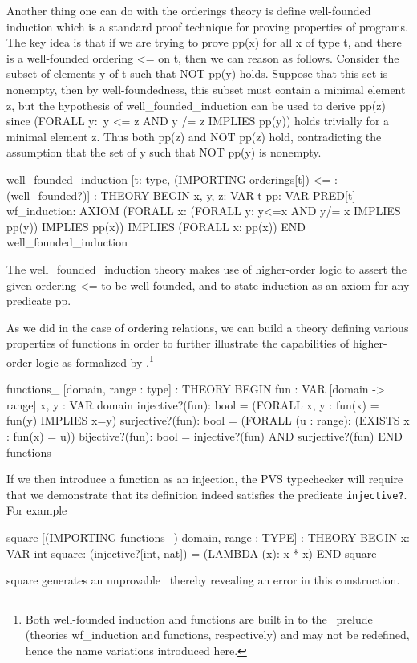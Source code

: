 Another thing one can do with the {\stt orderings} theory is define
well-founded induction which is a standard proof technique for proving
properties of programs.  The key idea is that if we are trying to
prove {\stt pp(x)} for all {\stt x} of type {\stt t}, and there is a
well-founded ordering {\stt <=} on {\stt t}, then we can reason as
follows.  Consider the subset of elements {\stt y} of {\stt t} such
that {\stt NOT pp(y)} holds.  Suppose that this set is nonempty, then
by well-foundedness, this subset must contain a minimal element {\stt
z}, but the hypothesis of {\stt well\_founded\_induction} can be used
to derive {\stt pp(z)} since {\stt (FORALL y:\ y <= z AND y /= z
IMPLIES pp(y))} holds trivially for a minimal element {\stt z}.  Thus
both {\stt pp(z)} and {\stt NOT pp(z)} hold, contradicting the
assumption that the set of {\stt y} such that {\stt NOT pp(y)} is
nonempty.
\begin{pvsexample}
  well_founded_induction [t: type,
                 (IMPORTING orderings[t])
                 <= : (well_founded?)] : THEORY
   BEGIN
    x, y, z: VAR t
    pp: VAR PRED[t]
    wf_induction: AXIOM
      (FORALL x: (FORALL y: y<=x AND y/= x IMPLIES pp(y))
                 IMPLIES pp(x))
      IMPLIES (FORALL x: pp(x))
   END well_founded_induction
\end{pvsexample}

The {\stt well\_founded\_induction} theory makes use of higher-order
logic to assert the given ordering {\stt <=} to be well-founded, and
to state induction as an axiom for any predicate {\stt pp}.

As we did in the case of ordering relations, we can build a theory
defining various properties of functions in order to further illustrate
the capabilities of higher-order logic as formalized by \pvs\@.\footnote
{Both well-founded induction and functions are built in to the \pvs\
prelude (theories {\stt wf\_induction} and {\stt functions}, respectively)
and may not be redefined, hence the name variations introduced here.}
\begin{pvsexample}
  functions_ [domain, range : type] : THEORY
   BEGIN
    fun : VAR [domain -> range]
    x, y : VAR domain
    injective?(fun): bool = (FORALL x, y : fun(x) = fun(y) IMPLIES x=y)
    surjective?(fun): bool = (FORALL (u : range): (EXISTS x : fun(x) = u))
    bijective?(fun): bool = injective?(fun) AND surjective?(fun)
   END functions_
\end{pvsexample}
%
If we then introduce a function as an injection, the PVS typechecker will
require that we demonstrate that its definition indeed satisfies the
predicate {\tt injective?}.  For example
\begin{pvsexample}
  square [(IMPORTING functions_) domain, range : TYPE] : THEORY
   BEGIN
    x: VAR int
    square: (injective?[int, nat]) = (LAMBDA (x): x * x)
   END square
\end{pvsexample}
{\stt square} generates an unprovable \tcc\, thereby revealing an
error in this construction.


